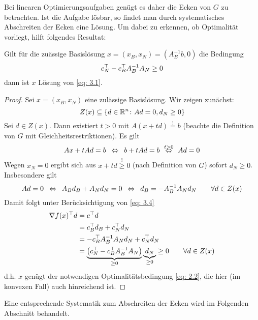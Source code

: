 Bei linearen Optimierungsaufgaben genügt es daher die Ecken von $G$ zu betrachten. Ist die Aufgabe lösbar, so findet man durch systematisches Abschreiten der Ecken eine Lösung.
Um dabei zu erkennen, ob Optimalität vorliegt, hilft folgendes Resultat:

\begin{aussage}[Optimalitätskriterium] %
	\label{aussage: 3.4}
	Gilt für die zuässige Basislösung $x = (x_B, x_N) = (A_B^{-1}b, 0)$ die Bedingung 
	\begin{equation}
		c_N^{\top} - c_B^{\top} A_B^{-1} A_N \ge 0 \label{eq: 3.4}
	\end{equation}
	dann ist $x$ Lösung von \eqref{eq: 3.1}.
\end{aussage}
\begin{proof}
	Sei $x = (x_B, x_N)$ eine zulässige Basislösung. Wir zeigen zunächst:
	\begin{equation*}
		Z(x) \subseteq \left\{ d \in \mathbb{R}^n \colon Ad = 0, d_N \ge 0 \right\}
	\end{equation*}
	Sei $d \in Z(x)$. Dann existiert $t > 0$ mit $A(x+td) \overset{!}{=} b$ (beachte die Definition von $G$ mit Gleichheitsrestriktionen). Es gilt 
	\begin{equation*}
		Ax + t Ad = b  \enskip \Leftrightarrow \enskip b + t Ad = b \overset{t > 0}{\enskip \Leftrightarrow \enskip} Ad = 0
	\end{equation*}
	Wegen $x_N = 0$ ergibt sich aus $x + td \overset{!}{\ge} 0$ (nach Definition von $G$) sofort $d_N \ge 0$. Insbesondere gilt
	\begin{equation*}
		Ad = 0 \enskip \Leftrightarrow \enskip A_B d_B + A_N d_N = 0 \enskip \Leftrightarrow \enskip d_B = -A_B^{-1} A_N d_N \qquad \forall d \in Z(x)
	\end{equation*}
	Damit folgt unter Berücksichtigung von \eqref{eq: 3.4}
	\begin{align*}
		\nabla f(x)^{\top} d 
		&= c^{\top} d \\
		&= c_B^{\top} d_B + c_N^{\top} d_N \\
		&= -c_B^{\top} A_B^{-1} A_N d_N + c_N^{\top} d_N \\
		&= \underbrace{\left( c_N^{\top} - c_B^{\top} A_B^{-1} A_N \right)}_{\ge 0} \underbrace{d_N}_{\ge 0} \ge 0 \qquad \forall d \in Z(x)
	\end{align*}
	d.h. $x$ genügt der notwendigen Optimalitätsbedingung \eqref{eq: 2.2}, die hier (im konvexen Fall) auch hinreichend ist.
\end{proof}

Eine entsprechende Systematik zum Abschreiten der Ecken wird im Folgenden Abschnitt behandelt.

